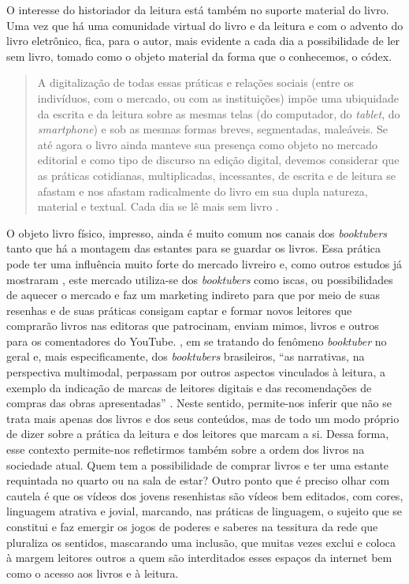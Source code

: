 O interesse do historiador da leitura está também no suporte material do
livro. Uma vez que há uma comunidade virtual do livro e da leitura e com
o advento do livro eletrônico, fica, para o autor, mais evidente a cada
dia a possibilidade de ler sem livro, tomado como o objeto material da
forma que o conhecemos, o códex.

\begin{quote}
A digitalização de todas essas práticas e relações sociais (entre os
indivíduos, com o mercado, ou com as instituições) impõe uma ubiquidade
da escrita e da leitura sobre as mesmas telas (do computador, do \textit{tablet}, do \textit{smartphone}) e sob as mesmas formas breves, segmentadas, maleáveis. Se até agora o livro ainda manteve sua presença como objeto no mercado editorial e como tipo de discurso na edição digital, devemos considerar que as práticas cotidianas, multiplicadas, incessantes, de escrita e de leitura se afastam e nos afastam radicalmente do livro em sua dupla
natureza, material e textual. Cada dia se lê mais sem livro \cite[p. 15–16]{chartier2019lersem}.
\end{quote}

O objeto livro físico, impresso, ainda é muito comum nos canais dos
\textit{booktubers} tanto que há a montagem das estantes para se guardar
os livros. Essa prática pode ter uma influência muito forte do mercado
livreiro e, como outros estudos já mostraram \cite{costa2018booktubers,aguiar2017critica}, este mercado utiliza-se dos
\textit{booktubers} como iscas, ou possibilidades de aquecer o mercado e
faz um marketing indireto para que por meio de suas resenhas e de suas
práticas consigam captar e formar novos leitores que comprarão livros
nas editoras que patrocinam, enviam mimos, livros e outros para os
comentadores do YouTube. \textcite{fialho2023booktubers}, em se tratando do
fenômeno \textit{booktuber} no geral e, mais especificamente, dos
\textit{booktubers} brasileiros, \enquote{as narrativas, na perspectiva
multimodal, perpassam por outros aspectos vinculados à leitura, a
exemplo da indicação de marcas de leitores digitais e das recomendações
de compras das obras apresentadas} \cite[p. 12]{fialho2023booktubers}. Neste
sentido, permite-nos inferir que não se trata mais apenas dos livros e
dos seus conteúdos, mas de todo um modo próprio de dizer sobre a prática
da leitura e dos leitores que marcam a si. Dessa forma, esse contexto
permite-nos refletirmos também sobre a ordem dos livros na sociedade
atual. Quem tem a possibilidade de comprar livros e ter uma estante
requintada no quarto ou na sala de estar? Outro ponto que é preciso
olhar com cautela é que os vídeos dos jovens resenhistas são vídeos bem
editados, com cores, linguagem atrativa e jovial, marcando, nas práticas
de linguagem, o sujeito que se constitui e faz emergir os jogos de
poderes e saberes na tessitura da rede que pluraliza os sentidos,
mascarando uma inclusão, que muitas vezes exclui e coloca à margem
leitores outros a quem são interditados esses espaços da internet bem
como o acesso aos livros e à leitura.

